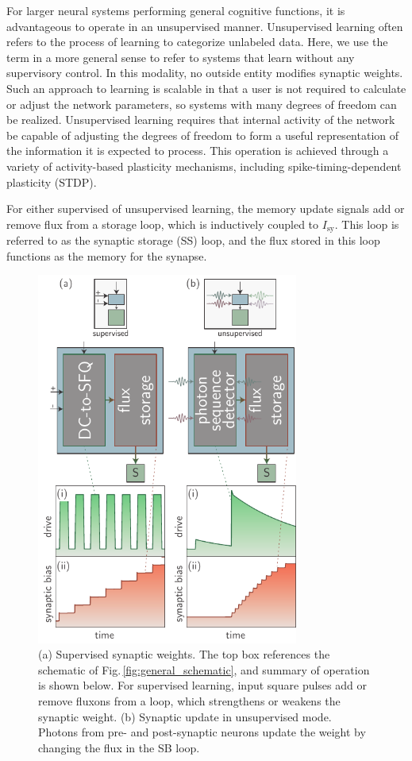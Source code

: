 \documentclass[aip,amsmath,amssymb,reprint,nofootinbib]{revtex4-1}
\begin{document}
For larger neural systems performing general cognitive functions, it is advantageous to operate in an unsupervised manner. Unsupervised learning often refers to the process of learning to categorize unlabeled data. Here, we use the term in a more general sense to refer to systems that learn without any supervisory control. In this modality, no outside entity modifies synaptic weights. Such an approach to learning is scalable in that a user is not required to calculate or adjust the network parameters, so systems with many degrees of freedom can be realized. Unsupervised learning requires that internal activity of the network be capable of adjusting the degrees of freedom to form a useful representation of the information it is expected to process. This operation is achieved through a variety of activity-based plasticity mechanisms, including spike-timing-dependent plasticity (STDP).

For either supervised of unsupervised learning, the memory update signals add or remove flux from a storage loop, which is inductively coupled to $I_{\mathrm{sy}}$. This loop is referred to as the synaptic storage (SS) loop, and the flux stored in this loop functions as the memory for the synapse.
\begin{figure}[t!]
	\centerline{\includegraphics[width=8.6cm]{_synapticPlasticity_schematic_small.pdf}}
	\caption{\label{fig:synapticPlasticity_schematic}(a) Supervised synaptic weights. The top box references the schematic of Fig.\,\ref{fig:general_schematic}, and summary of operation is shown below. For supervised learning, input square pulses add or remove fluxons from a loop, which strengthens or weakens the synaptic weight. (b) Synaptic update in unsupervised mode. Photons from pre- and post-synaptic neurons update the weight by changing the flux in the SB loop.}
\end{figure}
\end{document}
